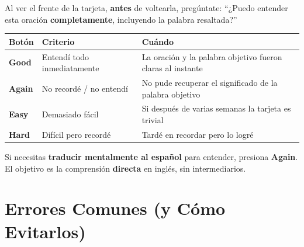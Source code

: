 \documentclass[12pt,a4paper]{article}
\begin{document}
\begin{cajamineria}
Al ver el frente de la tarjeta, \textbf{antes} de voltearla, pregúntate: ``¿Puedo entender esta oración \textbf{completamente}, incluyendo la palabra resaltada?''

\medskip
\begin{tabularx}{\textwidth}{@{} l l X @{}}
\toprule
\textbf{Botón} & \textbf{Criterio} & \textbf{Cuándo} \\
\midrule
\textcolor{bueno}{\textbf{Good}} & Entendí todo inmediatamente & La oración y la palabra objetivo fueron claras al instante \\
\textcolor{malo}{\textbf{Again}} & No recordé / no entendí & No pude recuperar el significado de la palabra objetivo \\
\textcolor{acento}{\textbf{Easy}} & Demasiado fácil & Si después de varias semanas la tarjeta es trivial \\
\textcolor{ejemplo}{\textbf{Hard}} & Difícil pero recordé & Tardé en recordar pero lo logré \\
\bottomrule
\end{tabularx}

\medskip
\begin{cajaejemplo}
Si necesitas \textbf{traducir mentalmente al español} para entender, presiona \textbf{Again}. El objetivo es la comprensión \textbf{directa} en inglés, sin intermediarios.
\end{cajaejemplo}
\end{cajamineria}

\section{Errores Comunes (y Cómo Evitarlos)}
\end{document}

